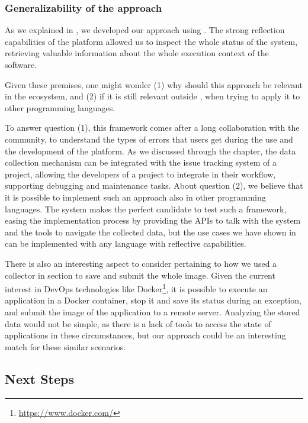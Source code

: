 \subsubsection{Generalizability of the approach}

As we explained in , we developed our approach using \pha.
The strong reflection capabilities of the platform allowed us to inspect the whole status of the system, retrieving valuable information about the whole execution context of the software.

Given these premises, one might wonder (1) why should this approach be relevant in the \pha ecosystem, and (2) if it is still relevant outside \pha, when trying to apply it to other programming languages.

To answer question (1), this framework comes after a long collaboration with the \pha community, to understand the types of errors that users get during the use and the development of the platform.
As we discussed through the chapter, the data collection mechanism can be integrated with the issue tracking system of a project, allowing the developers of a project to integrate \sln in their workflow, supporting debugging and maintenance tasks.
About question (2), we believe that it is possible to implement such an approach also in other programming languages.
The \pha system makes the perfect candidate to test such a framework, easing the implementation process by providing the APIs to talk with the system and the tools to navigate the collected data, but the use cases we have shown in  can be implemented with any language with reflective capabilities.

There is also an interesting aspect to consider pertaining to how we used a collector in section  to save and submit the whole \pha image.
Given the current interest in DevOps technologies like Docker\footnote{\url{https://www.docker.com/}}, it is possible to execute an application in a Docker container, stop it and save its status during an exception, and submit the image of the application to a remote server.
Analyzing the stored data would not be simple, as there is a lack of tools to access the state of applications in these circumstances, but our approach could be an interesting match for these similar scenarios.


\subsection{Next Steps}

